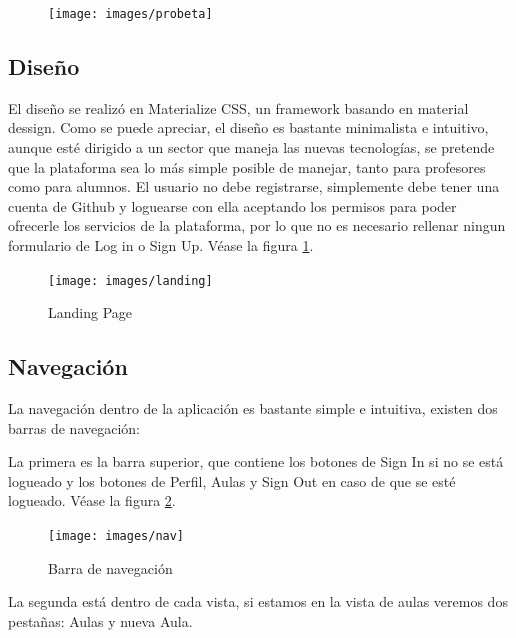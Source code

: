\begin{figure}[!th]
\begin{center}
\texttt{[image: images/probeta]}
\end{center}
\end{figure}

\subsection{Diseño}
\label{3:5:1}

El diseño se realizó en Materialize CSS, un framework basando en material dessign. Como se puede apreciar, el diseño es bastante minimalista e intuitivo, aunque esté dirigido a un sector que maneja las nuevas tecnologías, se pretende que la plataforma sea lo más simple posible de manejar, tanto para profesores como para alumnos.
El usuario no debe registrarse, simplemente debe tener una cuenta de Github y loguearse con ella aceptando los permisos para poder ofrecerle los servicios de la plataforma, por lo que no es necesario rellenar ningun formulario de Log in o Sign Up. 
Véase la figura \ref{fig:Landing page}.

\begin{figure}[!th]
\begin{center}
\texttt{[image: images/landing]}
\caption{Landing Page}
\label{fig:Landing page}
\end{center}
\end{figure}

\newpage

\subsection{Navegación}
\label{3:5:2}

La navegación dentro de la aplicación es bastante simple e intuitiva, existen dos barras de navegación:

La primera es la barra superior, que contiene los botones de Sign In si no se está logueado y los botones de Perfil, Aulas y Sign Out en caso de que se esté logueado.
Véase la figura \ref{fig:Barra de navegacion}.

\begin{figure}[!th]
\begin{center}
\texttt{[image: images/nav]}
\caption{Barra de navegación}
\label{fig:Barra de navegacion}
\end{center}
\end{figure}

La segunda está dentro de cada vista, si estamos en la vista de aulas veremos dos pestañas: Aulas y nueva Aula.


